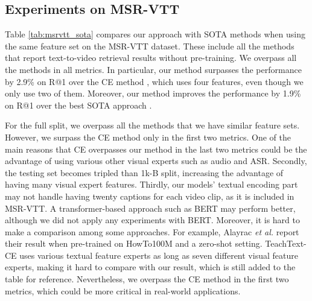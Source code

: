 \documentclass[lettersize,journal]{IEEEtran}
\begin{document}
\subsection{Experiments on MSR-VTT}







Table \ref{tab:msrvtt_sota} compares our approach with SOTA methods when using the same feature set on the MSR-VTT dataset. These include all the methods that report text-to-video retrieval results without pre-training. We overpass all the methods in all metrics. In particular, our method surpasses the performance by 2.9\% on R@1 over the CE method \cite{Liu2019a}, which uses four features, even though we only use two of them. Moreover, our method improves the performance by 1.9\% on R@1 over the best SOTA approach \cite{taco}.

For the full split, we overpass all the methods that we have similar feature sets. However, we surpass the CE method \cite{Liu2019a} only in the first two metrics. One of the main reasons that CE overpasses our method in the last two metrics could be the advantage of using various other visual experts such as audio and ASR. Secondly, the testing set becomes tripled than 1k-B split, increasing the advantage of having many visual expert features. Thirdly, our models' textual encoding part may not handle having twenty captions for each video clip, as it is included in MSR-VTT. A transformer-based approach such as BERT may perform better, although we did not apply any experiments with BERT. Moreover, it is hard to make a comparison among some approaches. For example, Alayrac \textit{et al.} \cite{miech20endtoend} report their result when pre-trained on HowTo100M and a zero-shot setting. TeachText-CE \cite{croitoru2021teachtext} uses various textual feature experts as long as seven different visual feature experts, making it hard to compare with our result, which is still added to the table for reference. Nevertheless, we overpass the CE method in the first two metrics, which could be more critical in real-world applications.
\end{document}
